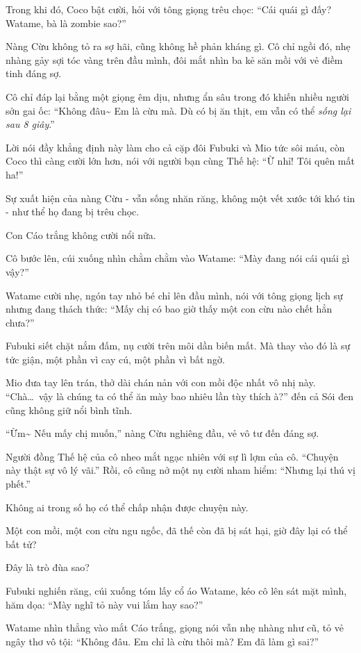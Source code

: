 \documentclass[../main.tex]{subfiles}
\begin{document}
Trong khi đó, Coco bật cười, hỏi với tông giọng trêu chọc: ``Cái quái gì đấy? Watame, bà là zombie sao?''

Nàng Cừu không tỏ ra sợ hãi, cũng không hề phản kháng gì. Cô chỉ ngồi đó, nhẹ nhàng gảy sợi tóc vàng trên đầu mình, đôi mắt nhìn ba kẻ săn mồi với vẻ điềm tinh đáng sợ.


Cô chỉ đáp lại bằng một giọng êm dịu, nhưng ẩn sâu trong đó khiến nhiều người sởn gai ốc: ``Không đâu\~{} Em là cừu mà. Dù có bị ăn thịt, em vẫn có thể \emph{sống lại sau 8 giây}.''

Lời nói đầy khẳng định này làm cho cả cặp đôi Fubuki và Mio tức sôi máu, còn Coco thì càng cười lớn hơn, nói với người bạn cùng Thế hệ: ``Ừ nhỉ! Tôi quên mất ha!''

Sự xuất hiện của nàng Cừu - vẫn sống nhăn răng, không một vết xước tới khó tin - như thể họ đang bị trêu chọc.

Con Cáo trắng không cười nổi nữa.

Cô bước lên, cúi xuống nhìn chằm chằm vào Watame: ``Mày đang nói cái quái gì vậy?''

Watame cười nhẹ, ngón tay nhỏ bé chỉ lên đầu mình, nói với tông giọng lịch sự nhưng đang thách thức: ``Mấy chị có bao giờ thấy một con cừu nào chết hẳn chưa?''

Fubuki siết chặt nắm đấm, nụ cười trên môi dần biến mất. Mà thay vào đó là sự tức giận, một phần vì cay cú, một phần vì bất ngờ.

Mio đưa tay lên trán, thở dài chán nản với con mồi độc nhất vô nhị này. ``Chà\dots\ vậy là chúng ta có thể ăn mày bao nhiêu lần tùy thích à?'' đến cả Sói đen cũng không giữ nổi bình tĩnh.

``Ừm\~{} Nếu mấy chị muốn,'' nàng Cừu nghiêng đầu, vẻ vô tư đến đáng sợ.

Người đồng Thế hệ của cô nheo mắt ngạc nhiên với sự lì lợm của cô. ``Chuyện này thật sự vô lý vãi.'' Rồi, cô cũng nở một nụ cười nham hiểm: ``Nhưng lại thú vị phết.''

Không ai trong số họ có thể chấp nhận được chuyện này.

Một con mồi, một con cừu ngu ngốc, đã thế còn đã bị sát hại, giờ đây lại có thể bất tử?

Đây là trò đùa sao?

Fubuki nghiến răng, cúi xuống tóm lấy cổ áo Watame, kéo cô lên sát mặt mình, hăm dọa: ``Mày nghĩ tỏ này vui lắm hay sao?''

Watame nhìn thẳng vào mắt Cáo trắng, giọng nói vẫn nhẹ nhàng như cũ, tỏ vẻ ngây thơ vô tội: ``Không đâu. Em chỉ là cừu thôi mà? Em đã làm gì sai?''
\end{document}
